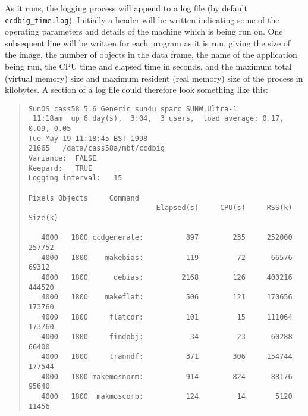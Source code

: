 As it runs, the logging process will append to a log file 
(by default {\tt ccdbig\_time.log}).
Initially a header will be written indicating some of the
operating parameters and details of the machine which is
being run on.
One subsequent line will be written for each program as it is run,
giving
the size of the image, 
the number of objects in the data frame,
the name of the application being run,
the CPU time and
elapsed time in seconds,
and
the maximum total (virtual memory) size and
maximum resident (real memory) size of the process in kilobytes.
A section of a log file could therefore look something like this:
\begin{quote}
\begin{verbatim}
SunOS cass58 5.6 Generic sun4u sparc SUNW,Ultra-1
 11:18am  up 6 day(s),  3:04,  3 users,  load average: 0.17, 0.09, 0.05
Tue May 19 11:18:45 BST 1998
21665   /data/cass58a/mbt/ccdbig
Variance:  FALSE
Keepard:   TRUE
Logging interval:   15

Pixels Objects     Command
                              Elapsed(s)     CPU(s)     RSS(k)    Size(k)

   4000   1800 ccdgenerate:          897        235     252000     257752
   4000   1800    makebias:          119         72      66576      69312
   4000   1800      debias:         2168        126     400216     444520
   4000   1800    makeflat:          506        121     170656     173760
   4000   1800     flatcor:          101         15     111064     173760
   4000   1800     findobj:           34         23      60288      66400
   4000   1800     tranndf:          371        306     154744     177544
   4000   1800 makemosnorm:          914        824      88176      95640
   4000   1800  makmoscomb:          124         14       5120      11456
\end{verbatim}
\end{quote}

